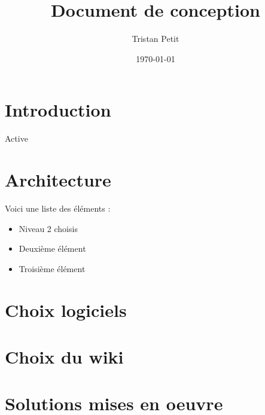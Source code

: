 \documentclass{report}
\begin{document}
\title{Document de conception}
\author{Tristan Petit}
\date{\today}
\maketitle

\tableofcontents


\section{Introduction}
Active 


\section{Architecture}
Voici une liste des éléments :
\begin{itemize}
    \item Niveau 2 choisis
    \item Deuxième élément
    \item Troisième élément
\end{itemize}

\section{Choix logiciels}



\section{Choix du wiki}



\section{Solutions mises en oeuvre}
\end{document}
